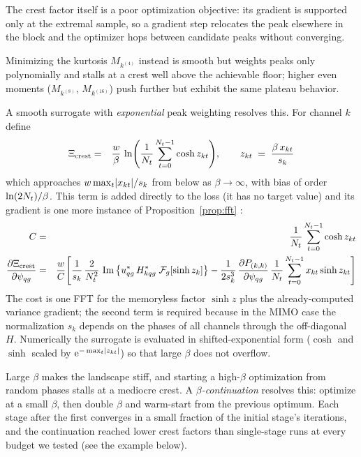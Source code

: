 \documentclass[10pt,a4paper]{article}
\numberwithin{equation}{section}
\DeclarePairedDelimiter\abs{\lvert}{\rvert}
\DeclarePairedDelimiter\block{[}{]}
\DeclarePairedDelimiter\mat{(}{)}
\DeclareMathOperator{\Imag}{Im}
\newcommand{\im}[1]{\Imag\left\{#1\right\}}
\newcommand{\m}[1]{\mathrm{#1}}
\begin{document}
The crest factor itself is a poor optimization objective: its gradient is supported only at the extremal sample, so a gradient step relocates the peak elsewhere in the block and the optimizer hops between candidate peaks without converging. 

Minimizing the kurtosis $M_{k^{(4)}}$ instead is smooth but weights peaks only polynomially and stalls at a crest well above the achievable floor; higher even moments ($M_{k^{(8)}}$, $M_{k^{(16)}}$) push further but exhibit the same plateau behavior.

A smooth surrogate with \emph{exponential} peak weighting resolves this. For channel $k$ define
\begin{eqnarray}
\Xi_{\m{crest}} &=& \frac{w}{\beta}\,\ln\mat*{\frac{1}{N_t}\sum_{t=0}^{N_t-1}\cosh z_{k t}},
\qquad z_{k t} \;=\; \frac{\beta\, x_{k t}}{s_k}
\end{eqnarray}
which approaches $w \max_t \abs{x_{k t}}/s_k$ from below as $\beta\to\infty$, with bias of order $\ln\mat{2 N_t}/\beta$. This term is added directly to the loss (it has no target value) and its gradient is one more instance of Proposition~\ref{prop:fft} :
\begin{eqnarray}
	C &=& \frac{1}{N_t}\sum_{t=0}^{N_t-1} \cosh z_{k t} \\
	\frac{\partial \Xi_{\m{crest}}}{\partial \psi_{q g}}
	  &=& \frac{w}{C}\block*{
	  	  \frac{1}{s_k}\,\frac{2}{N_t^2}\,
		  	  \im{u_{q g}^*\, H_{k q g}^*\;\mathcal{F}_g\block*{\sinh z_{k}}}
		- \frac{1}{2 s_k^3} \, \frac{\partial P_{(k,k)}} {\partial \psi_{q g}} \,
		  	  \frac{1}{N_t} \sum_{t=0}^{N_t-1} x_{k t}\sinh z_{k t} }
\end{eqnarray}
The cost is one FFT for the memoryless factor $\sinh z$ plus the already-computed variance gradient; the second term is required because in the MIMO case the normalization $s_k$ depends on the phases of all channels through the off-diagonal $H$. Numerically the surrogate is evaluated in shifted-exponential form ($\cosh$ and $\sinh$ scaled by $\m{e}^{-\max_t\abs{z_{k t}}}$) so that large $\beta$ does not overflow.

Large $\beta$ makes the landscape stiff, and starting a high-$\beta$ optimization from random phases stalls at a mediocre crest. A \emph{$\beta$-continuation} resolves this: optimize at a small $\beta$, then double $\beta$ and warm-start from the previous optimum. Each stage after the first converges in a small fraction of the initial stage's iterations, and the continuation reached lower crest factors than single-stage runs at every budget we tested (see the example below). 
\end{document}
